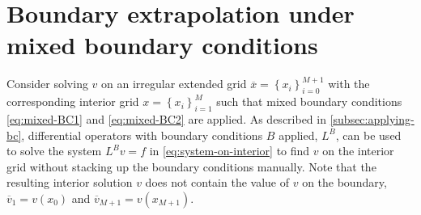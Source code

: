 \documentclass[11pt]{article}
\newcommand{\set}[1]{\ensuremath{\left\{{#1}\right\}}}
\theoremstyle{definition}
\begin{document}
\section{Boundary extrapolation under mixed boundary conditions}
Consider solving $v$ on an irregular extended grid $\overline{x} = \set{x_i}_{i=0}^{M+1}$ with the corresponding interior grid $x = \set{x_i}_{i=1}^M $ such that mixed boundary conditions \eqref{eq:mixed-BC1} and \eqref{eq:mixed-BC2} are applied. As described in \ref{subsec:applying-bc}, differential operators with boundary conditions $B$ applied, $L^B$, can be used to solve the system $L^B v = f$ in \eqref{eq:system-on-interior} to find $v$ on the interior grid without stacking up the boundary conditions manually. Note that the resulting interior solution $v$ does not contain the value of $v$ on the boundary, $\overline{v}_1 = v(x_0)$ and $\overline{v}_{M+1} = v(x_{M+1})$. 
\end{document}
